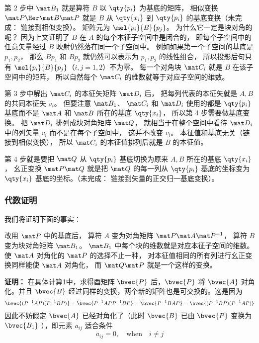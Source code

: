 第 2 步中 $\mat B_1$ 就是算符 $B$ 以 $\qty{p_i}$ 为基底的矩阵， 相似变换 $\mat P\Her \mat B\mat P$ 就是 $B$ 从 $\qty{x_i}$ 到 $\qty{p_i}$ 的基底变换（未完成： 链接到相似变换）。 矩阵元为 $\mel{p_i}{B}{p_j}$。 为什么它一定是块对角的呢？ 因为上文证明了 $B$ 在 $A$ 的每个本征子空间中是闭合的， 即每个子空间中的任意矢量经过 $B$ 映射仍然落在同一个子空间中。 例如如果第一个子空间的基底是 $p_1, p_2$， 那么 $B p_1$ 和 $B p_2$ 就仍然可以表示为 $p_1, p_2$ 的线性组合， 所以投影后句只有 $\mel{p_i}{B}{p_j}$（$i,j=1,2$）不为零。 每一个对角块 $\mat C_i$ 就是 $B$ 在该子空间中的矩阵， 所以自然每个 $\mat C_i$ 的维数就等于对应子空间的维数。

第 3 步中解出 $\mat C_i$ 的本征矢矩阵 $\mat D_i$ 后， 把每列代表的本征矢就是 $A, B$ 的共同本征矢 $v_i$。 但要注意 $\mat B_1$、 $\mat C_i$ 和 $\mat D_i$ 使用的都是 $\qty{p_i}$ 基底而不是 $\mat A$ 和 $\mat B$ 所在的基底 $\qty{x_i}$， 所以第 4 步需要做基底变换。 把 $\mat D_i$ 排列成块对角矩阵 $\mat Q$， 就相当于在整个空间中看待 $\mat D_i$ 中的列矢量 $v_i$ 而不是在每个子空间中， 这并不改变 $v_i$。 本征值和基底无关（链接到相似变换）， 所以 $\mat C_i$ 的本征值排列后就是 $B$ 的本征值。

第 4 步就是要把 $\mat Q$ 从 $\qty{p_i}$ 基底切换为原来 $A, B$ 所在的基底 $\qty{x_i}$， 幺正变换 $\mat P\mat Q$ 就是把 $\mat Q$ 的每一列从 $\qty{p_i}$ 基底的坐标变为 $\qty{x_i}$ 基底的坐标。（未完成： 链接到矢量的正交归一基底变换）。


\subsubsection{代数证明}
我们将证明下面的事实：

改用 $\mat P$ 中的基底后， 算符 $A$ 变为对角矩阵 $\mat P \mat A\mat P^{-1}$， 算符 $B$ 变为块对角矩阵 $\mat B_1$。 $\mat B_1$ 中每个块的维数就是对应本征子空间的维数。 使 $\mat A$ 对角化的 $\mat P$ 的选择不止一种， 对本征值相同的所有列进行幺正变换同样能使 $\mat A$ 对角化， 而 $\mat Q\mat P$ 就是一个这样的变换。

\textbf{证明：}
在具体计算1中，求得酉矩阵 $\bvec{P}$ 后，$\bvec{P}$ 将 $\bvec{A}$ 对角化。并且 $\bvec{B}$ 经过同样的变换，两个新的矩阵也是可交换的。这是因为
\begin{equation}
\bvec{(P^{-1}AP)(P^{-1}BP)}=\bvec{P^{-1}APP^{-1}BP}=\bvec{P^{-1}BAP}=\bvec{(P^{-1}BP)(P^{-1}AP)}
\end{equation}
因此不妨假定 $\bvec{A}$ 已经对角化了（此时 $\bvec{B}$ 已由 $\bvec{P}$ 变换为 $\bvec{B_1}$ ），即元素 $a_{ij}$ 适合条件
\begin{equation}
a_{ij}=0,\quad \mathrm{when} \quad i\neq j
\label{Commut_eq25}
\end{equation}

